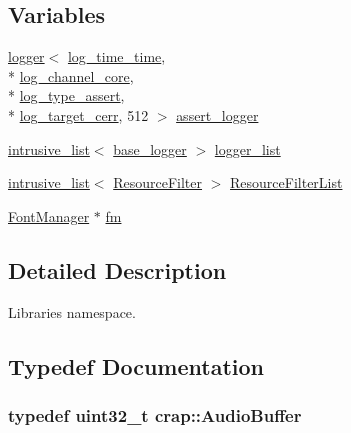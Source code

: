 \subsection*{Variables}
\begin{DoxyCompactItemize}
\item 
\hyperlink{singletoncrap_1_1logger}{logger}$<$ \hyperlink{structcrap_1_1log__time__time}{log\+\_\+time\+\_\+time}, \\*
\hyperlink{structcrap_1_1log__channel__core}{log\+\_\+channel\+\_\+core}, \\*
\hyperlink{structcrap_1_1log__type__assert}{log\+\_\+type\+\_\+assert}, \\*
\hyperlink{structcrap_1_1log__target__cerr}{log\+\_\+target\+\_\+cerr}, 512 $>$ \hyperlink{namespacecrap_a31dfc9e83068ad8e122d05579a3322a9}{assert\+\_\+logger}
\item 
\hyperlink{singletoncrap_1_1intrusive__list}{intrusive\+\_\+list}$<$ \hyperlink{classcrap_1_1base__logger}{base\+\_\+logger} $>$ \hyperlink{namespacecrap_a7eddbc265d59efb9cfb0e3d97853f9f4}{logger\+\_\+list}
\item 
\hyperlink{singletoncrap_1_1intrusive__list}{intrusive\+\_\+list}$<$ \hyperlink{classcrap_1_1_resource_filter}{Resource\+Filter} $>$ \hyperlink{namespacecrap_afebe7139a7ca8c9be1349914a6f2acc6}{Resource\+Filter\+List}
\item 
\hyperlink{class_font_manager}{Font\+Manager} $\ast$ \hyperlink{namespacecrap_a71c658e1e72d3374202195926265b0d9}{fm}
\end{DoxyCompactItemize}


\subsection{Detailed Description}
Libraries namespace. 

\subsection{Typedef Documentation}
\hypertarget{namespacecrap_a90f6b78604f0bc004080819aa4691107}{
\subsubsection[{Audio\+Buffer}]{\setlength{\rightskip}{0pt plus 5cm}typedef uint32\+\_\+t {\bf crap\+::\+Audio\+Buffer}}}\label{namespacecrap_a90f6b78604f0bc004080819aa4691107}


